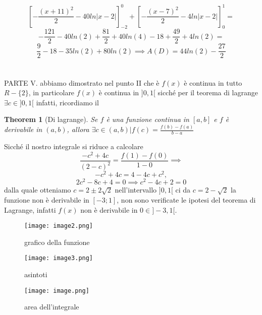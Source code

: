 \documentclass{article}
\newtheorem{theorem}{Theorem}
\begin{document}
\[
\left[ -\frac{(x+11)^2}{2} - 40ln|x-2|\right]_{-2}^0 + \left[ -\frac{(x-7)^2}{2} - 4ln|x-2|\right]_{0}^1 = 
\]
\[
-\frac{121}{2} - 40ln(2) + \frac{81}{2} + 40ln(4) -18 + \frac{49}{2} + 4ln(2) =
\]
\[
\frac{9}{2} - 18 - 35ln(2) + 80ln(2) \implies A(D) = 44ln(2) -\frac{27}{2}
\]
\\\\
PARTE V. abbiamo dimostrato nel punto II che è $f(x)$ è continua in tutto $R-\{2\}$, in particolare $f(x)$ è continua in $]0,1[$ sicché per il teorema di lagrange $\exists c \in ]0,1[$
infatti, ricordiamo il
\begin{theorem}[Di lagrange]
Se $f$ è una funzione continua in $[a,b]$ e $f$ è derivabile in $(a,b)$, allora $\exists c \in (a,b) |
f(c) = \frac{f(b)-f(a)}{b-a}$
\end{theorem}
Sicché il nostro integrale si riduce a calcolare
\[
\frac{-c^2+4c}{(2-c)^2} = \frac{f(1)-f(0)}{1-0} \implies
\]
\[
-c^2 + 4c = 4 -4c + c^2, 
\]
\[
2c^2 -8c + 4 = 0 \implies c^2 - 4c + 2 = 0
\]
dalla quale otteniamo $c = 2\pm2\sqrt{2}$ nell'intervallo $]0,1[$ ci da $c = 2-\sqrt{2}$
la funzione non è derivabile in $[-3;1]$, non sono verificate le ipotesi del teorema di Lagrange, infatti $f(x)$ non è derivabile in $0 \in ]-3,1[$.
\newpage
\begin{figure}
    \centering
    \texttt{[image: image2.png]}
    \caption{grafico della funzione}
    \label{fig:enter-label}
\end{figure}
\begin{figure}
    \centering
    \texttt{[image: image3.png]}
    \caption{asintoti}
    \label{fig:enter-label}
\end{figure}
\begin{figure}
    \centering
    \texttt{[image: image.png]}
    \caption{area dell'integrale}
    \label{fig:enter-label}
\end{figure}
\end{document}
